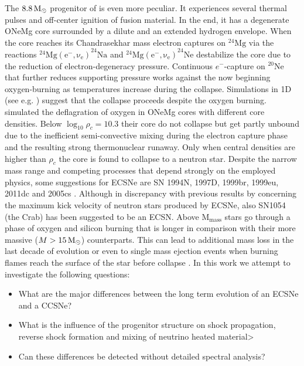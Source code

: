 \documentclass[fleqn,usenatbib]{mnras}
\newcommand{\solm}{\xspace\ensuremath{\rm{M_{\odot}}}}
\begin{document}
The $8.8\, \solm$ progenitor of \cite{Nomoto1984} is even more peculiar. It experiences  several thermal pulses and off-center ignition of fusion material. In the end, it has a degenerate ONeMg core surrounded by a dilute and an extended hydrogen envelope.
When the core reaches its Chandrasekhar mass electron captures on $\mathrm{^{24}Mg}$ via the reactions $\mathrm{^{24}Mg(e^-,\nu_e)}^{24}\mathrm{Na}$  and $\mathrm{^{24}Mg(e^-,\nu_e)}^{24}\mathrm{Ne}$ destabilize the core due to the reduction of electron-degeneracy pressure. Continuous $e^-$-capture on $\mathrm{^{20}Ne}$ that further reduces supporting pressure works against the now beginning oxygen-burning as temperatures increase during the collapse. Simulations in 1D (see e.g. \citep{Janka2008,Kitaura2006}) suggest that the collapse proceeds despite the oxygen burning. \cite{Jones2016} simulated the deflagration of oxygen in ONeMg cores with different core densities. Below $\log_{10}\rho_c=10.3$ their core do not collapse but get partly unbound due to the inefficient semi-convective mixing during the electron capture phase and the resulting strong thermonuclear runaway. Only when central densities are higher than $\rho_c$ the core is found to collapse to a neutron star.
Despite the narrow mass range and competing processes that depend strongly on the employed physics, some suggestions for ECSNe  are SN 1994N, 1997D, 1999br, 1999eu, 2011dc and 2005cs \citet{Stevenson2014}. Although in discrepancy with previous results by \citep{Gessner2018} concerning the maximum kick velocity of neutron stars produced by ECSNe, also SN1054 (the Crab) has been suggested to be an ECSN.
Above $\mathrm{M_{mass}}$ stars go through a phase of oxygen and silicon burning that is longer in comparison with their more massive ($M > 15\, \solm$) counterparts.  This can lead to additional mass loss in the last decade of evolution or even to single mass ejection events when burning flames reach the surface of the star before collapse \citet{Woosley2015}.
 In this work we attempt to investigate the following questions:
\begin{itemize}
\item  What are the major differences between the long term evolution of an ECSNe and a CCSNe?
\item What is the influence of the progenitor structure on shock propagation, reverse shock formation and mixing of neutrino heated material>
\item Can these differences be detected without detailed spectral analysis?
\end {itemize}
\end{document}
